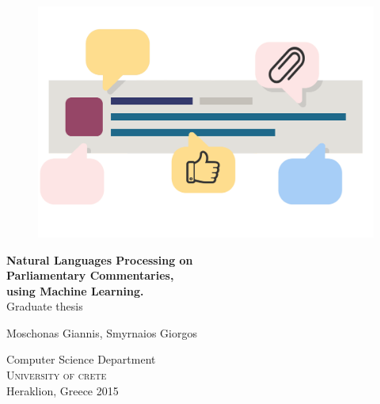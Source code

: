 
\begin{titlepage}
			
\addtolength{\voffset}{1cm}

\begin{figure}[H]
\centering
\vspace{1cm}	%
\includegraphics[width=0.9\linewidth]{figure/front_image.png}
\end{figure}

\mbox{}
\vfill
\renewcommand{\familydefault}{\sfdefault} \normalfont %
\textbf{{\huge Natural Languages Processing on\\Parliamentary Commentaries,\\using Machine Learning.}} 	\\[0.5cm]
Graduate thesis \setlength{\parskip}{1cm}

{\Large Moschonas Giannis, Smyrnaios Giorgos} \setlength{\parskip}{2.9cm}

Computer Science Department \\
\textsc{University of crete} \\
Heraklion, Greece 2015

\renewcommand{\familydefault}{\rmdefault} \normalfont %
\end{titlepage}


